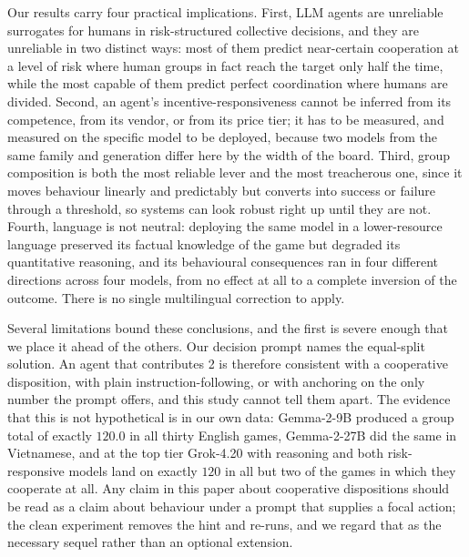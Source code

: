 \documentclass[openacc]{rsproca_new}
\begin{document}
Our results carry four practical implications. First, LLM agents are unreliable surrogates for humans in risk-structured collective decisions, and they are unreliable in two distinct ways: most of them predict near-certain cooperation at a level of risk where human groups in fact reach the target only half the time, while the most capable of them predict perfect coordination where humans are divided. Second, an agent's incentive-responsiveness cannot be inferred from its competence, from its vendor, or from its price tier; it has to be measured, and measured on the specific model to be deployed, because two models from the same family and generation differ here by the width of the board. Third, group composition is both the most reliable lever and the most treacherous one, since it moves behaviour linearly and predictably but converts into success or failure through a threshold, so systems can look robust right up until they are not. Fourth, language is not neutral: deploying the same model in a lower-resource language preserved its factual knowledge of the game but degraded its quantitative reasoning, and its behavioural consequences ran in four different directions across four models, from no effect at all to a complete inversion of the outcome. There is no single multilingual correction to apply.

\label{sec:limits}
Several limitations bound these conclusions, and the first is severe enough that we place it ahead of the others. Our decision prompt names the equal-split solution. An agent that contributes 2 is therefore consistent with a cooperative disposition, with plain instruction-following, or with anchoring on the only number the prompt offers, and this study cannot tell them apart. The evidence that this is not hypothetical is in our own data: Gemma-2-9B produced a group total of exactly $120.0$ in all thirty English games, Gemma-2-27B did the same in Vietnamese, and at the top tier Grok-4.20 with reasoning and both risk-responsive models land on exactly $120$ in all but two of the games in which they cooperate at all. Any claim in this paper about cooperative dispositions should be read as a claim about behaviour under a prompt that supplies a focal action; the clean experiment removes the hint and re-runs, and we regard that as the necessary sequel rather than an optional extension.
\end{document}
